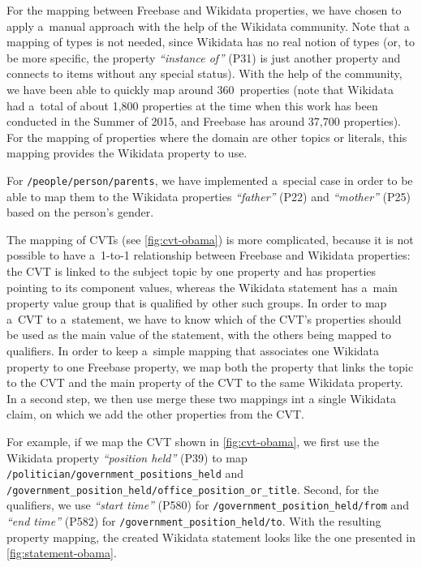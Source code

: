 \documentclass{acm_proc_article-sp}
\begin{document}
For the mapping between Freebase and Wikidata properties, we have chosen to apply a~manual
approach with the help of the Wikidata community.
Note that a mapping of types is not needed, since Wikidata has no real notion of types
(or, to be more specific, the property \textit{``instance of''} (P31) is just another
property and connects to items without any special status).
With the help of the community, we have been able to quickly map around 360~properties
(note that Wikidata had a~total of about 1,800 properties at the time when this work
has been conducted in the Summer of 2015, and Freebase has around 37,700 properties).
For the mapping of properties where the domain are other topics or literals,
this mapping provides the Wikidata property to use.

For \texttt{/people/person/parents}, we have implemented a~special case
in order to be able to map them to the Wikidata properties
\textit{``father''} (P22) and \textit{``mother''} (P25)
based on the person's gender.

The mapping of CVTs (see \autoref{fig:cvt-obama}) is more complicated,
because it is not possible to have a~\mbox{1-to-1} relationship
between Freebase and Wikidata properties: the CVT is linked to the subject topic by one property
and has properties pointing to its component values, whereas the Wikidata statement
has a~main property value group that is qualified by other such groups.
In order to map a~CVT to a~statement, we have to know which of the CVT's properties
should be used as the main value of the statement, with the others being mapped to qualifiers.
In order to keep a~simple mapping that associates one Wikidata property to one Freebase property,
we map both the property that links the topic to the CVT
and the main property of the CVT to the same Wikidata property. In a second step, we
then use merge these two mappings int a single Wikidata claim, on which we add the
other properties from the CVT.

For example, if we map the CVT shown in \autoref{fig:cvt-obama},
we first use the Wikidata property \textit{``position held''} (P39) to map
\texttt{/politician/government\_positions\_held} and \linebreak
\texttt{/government\_position\_held/office\_position\_or\_title}. \linebreak
Second, for the qualifiers, we use \textit{``start time''} (P580)
for \texttt{/government\_position\_held/from} and \textit{``end time''} (P582)
for \texttt{/government\_position\_held/to}.
With the resulting \linebreak property mapping, the created Wikidata statement
looks like the one presented in \autoref{fig:statement-obama}.
\end{document}
